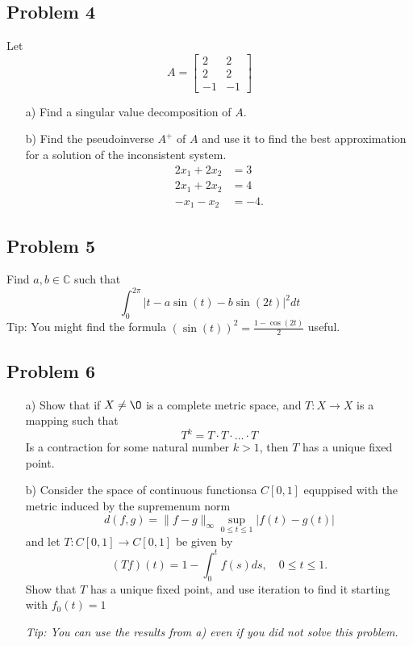 \documentclass{article}
\theoremstyle{remark}
\begin{document}
\subsection{Problem 4}%
\label{sub:problem_4}
Let 
\[
A =
\begin{bmatrix} 
2  & 2 \\
2 & 2 \\
-1  & -1
\end{bmatrix} 
\] 
\begin{enumerate}
  \item[a)]  Find a singular value decomposition of $A$.
  \item[b)] Find the pseudoinverse $A^{+}$ of $A$ and use it to find the best approximation for a solution of the inconsistent system.
    \begin{align*}
      2x_1 + 2x_2 &= 3 \\
      2x_1 + 2x_2 &= 4 \\
      -x_1 - x_2 &= -4
    .\end{align*}
\end{enumerate}


\subsection{Problem 5}%
\label{sub:problem_5}

Find $a,b \in \mathbb{C}$ such that \[
\int_{0}^{2\pi} \left\lvert t - a\sin\left( t \right) - b  \sin\left( 2t \right) \right\rvert ^{2} dt 
\] 
Tip: You might find the formula $\left( \sin \left( t \right) \right)^2 = \frac{1- \cos\left( 2t \right)}{2}$ useful.

\subsection{Problem 6}%
\label{sub:problem_6}

\begin{enumerate}
  \item[a)] Show that if $X \neq \O$ is a complete metric space, and $T: X \to X$ is a mapping such that \[
  T^{k} = T \cdot T\cdot \ldots \cdot T
\] Is a contraction for some natural number $k> 1 $, then $T$ has a unique fixed point. 
\item[b)]  Consider the space of continuous functionsa $C\left[ 0,1 \right]$ equppised with the metric induced by the supremenum norm \[
    d\left( f,g \right) = \|f-g\|_{\infty} \sup_{0\le t \le 1} \left| f\left( t \right) - g\left( t \right)  \right|
\] 
and let $T: C\left[ 0,1 \right] \to C\left[ 0,1 \right]$ be given by \[
\left( Tf \right)\left( t \right) = 1 - \int_{0}^{t} f\left( s \right) ds , \quad 0 \le t \le 1. 
\] 
Show that $T$ has a unique fixed point, and use iteration to find it starting with $f_0\left( t \right) = 1 $ 
\par 
\textit{Tip: You can use the results from  a) even if you did not solve this problem.} 
\end{enumerate}
\end{document}
